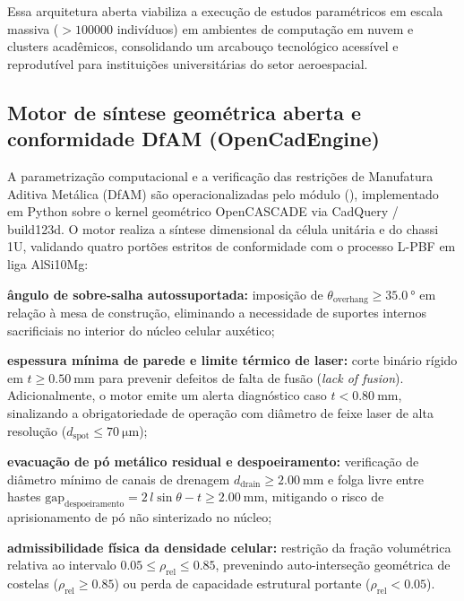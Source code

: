 Essa arquitetura aberta viabiliza a execução de estudos paramétricos em escala massiva ($> \num{100000}$ indivíduos) em ambientes de computação em nuvem e clusters acadêmicos, consolidando um arcabouço tecnológico acessível e reprodutível para instituições universitárias do setor aeroespacial.

\subsection{Motor de síntese geométrica aberta e conformidade DfAM (OpenCadEngine)}
\label{subsec:opencad-dfam}

A parametrização computacional e a verificação das restrições de Manufatura Aditiva Metálica (DfAM) são operacionalizadas pelo módulo  (), implementado em Python sobre o kernel geométrico OpenCASCADE via CadQuery / build123d. O motor realiza a síntese dimensional da célula unitária e do chassi 1U, validando quatro portões estritos de conformidade com o processo L-PBF em liga AlSi10Mg:
\begin{alineas}
  \item \textbf{ângulo de sobre-salha autossuportada:} imposição de $\theta_{\text{overhang}} \ge \SI{35.0}{\degree}$ em relação à mesa de construção, eliminando a necessidade de suportes internos sacrificiais no interior do núcleo celular auxético;
  \item \textbf{espessura mínima de parede e limite térmico de laser:} corte binário rígido em $t \ge \SI{0.50}{\milli\metre}$ para prevenir defeitos de falta de fusão (\textit{lack of fusion}). Adicionalmente, o motor emite um alerta diagnóstico caso $t < \SI{0.80}{\milli\metre}$, sinalizando a obrigatoriedade de operação com diâmetro de feixe laser de alta resolução ($d_{\text{spot}} \le \SI{70}{\micro\metre}$);
  \item \textbf{evacuação de pó metálico residual e despoeiramento:} verificação de diâmetro mínimo de canais de drenagem $d_{\text{drain}} \ge \SI{2.00}{\milli\metre}$ e folga livre entre hastes $\text{gap}_{\text{despoeiramento}} = 2\,l\sin\theta - t \ge \SI{2.00}{\milli\metre}$, mitigando o risco de aprisionamento de pó não sinterizado no núcleo;
  \item \textbf{admissibilidade física da densidade celular:} restrição da fração volumétrica relativa ao intervalo $\num{0.05} \le \rho_{\text{rel}} \le \num{0.85}$, prevenindo auto-interseção geométrica de costelas ($\rho_{\text{rel}} \ge \num{0.85}$) ou perda de capacidade estrutural portante ($\rho_{\text{rel}} < \num{0.05}$).
\end{alineas}

